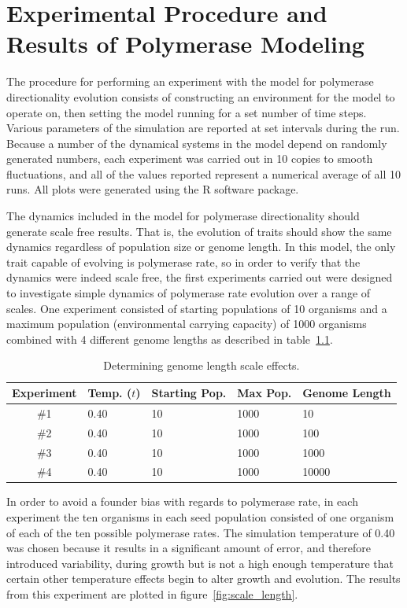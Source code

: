 \chapter{Experimental Procedure and Results of Polymerase Modeling} %
\label{cha:experimental_results_of_polymerase_modeling}
The procedure for performing an experiment with the model for polymerase directionality evolution consists of constructing an environment for the model to operate on, then setting the model running for a set number of time steps. Various parameters of the simulation are reported at set intervals during the run. Because a number of the dynamical systems in the model depend on randomly generated numbers, each experiment was carried out in 10 copies to smooth fluctuations, and all of the values reported represent a numerical average of all 10 runs. All plots were generated using the R software package.

The dynamics included in the model for polymerase directionality should generate scale free results. That is, the evolution of traits should show the same dynamics regardless of population size or genome length. In this model, the only trait capable of evolving is polymerase rate, so in order to verify that the dynamics were indeed scale free, the first experiments carried out were designed to investigate simple dynamics of polymerase rate evolution over a range of scales. One experiment consisted of starting populations of 10 organisms and a maximum population (environmental carrying capacity) of 1000 organisms combined with 4 different genome lengths as described in table~\ref{tab:scale_length}.

\begin{table}
	\begin{center}
		\begin{tabular}[c]{ c | l | l | l | l }
			Experiment & Temp. ($t$) & Starting Pop. & Max Pop. & Genome Length \\
			\hline
			\#1 & 0.40 & 10 & 1000 & 10 \\
			\#2 & 0.40 & 10 & 1000 & 100 \\
			\#3 & 0.40 & 10 & 1000 & 1000 \\
			\#4 & 0.40 & 10 & 1000 & 10000 \\
		\end{tabular}
		\caption{Determining genome length scale effects.}
		\label{tab:scale_length}
	\end{center}
\end{table}

In order to avoid a founder bias with regards to polymerase rate, in each experiment the ten organisms in each seed population consisted of one organism of each of the ten possible polymerase rates. The simulation temperature of 0.40 was chosen because it results in a significant amount of error, and therefore introduced variability, during growth but is not a high enough temperature that certain other temperature effects begin to alter growth and evolution. The results from this experiment are plotted in figure~\ref{fig:scale_length}.

